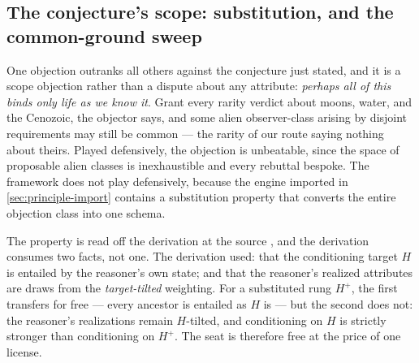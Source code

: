 \documentclass[11pt]{article}
\theoremstyle{definition}
\begin{document}
\subsection{The conjecture's scope: substitution, and the common-ground sweep}
\label{sec:oec-sweep}

One objection outranks all others against the conjecture just stated, and it is a scope objection rather than a dispute about any attribute: \emph{perhaps all of this binds only life as we know it}. Grant every rarity verdict about moons, water, and the Cenozoic, the objector says, and some alien observer-class arising by disjoint requirements may still be common --- the rarity of our route saying nothing about theirs. Played defensively, the objection is unbeatable, since the space of proposable alien classes is inexhaustible and every rebuttal bespoke. The framework does not play defensively, because the engine imported in \autoref{sec:principle-import} contains a substitution property that converts the entire objection class into one schema.

The property is read off the derivation at the source \cite{NexicFoundation}, and the derivation consumes two facts, not one. The derivation used: that the conditioning target $H$ is entailed by the reasoner's own state; and that the reasoner's realized attributes are draws from the \emph{target-tilted} weighting. For a substituted rung $H^{+}$, the first transfers for free --- every ancestor is entailed as $H$ is --- but the second does not: the reasoner's realizations remain $H$-tilted, and conditioning on $H$ is strictly stronger than conditioning on $H^{+}$. The seat is therefore free at the price of one license.
\end{document}
